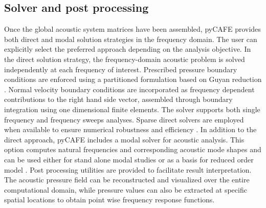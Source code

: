 \documentclass{jors}
\begin{document}
\subsection*{Solver and post processing}
Once the global acoustic system matrices have been assembled, pyCAFE provides both direct and modal solution strategies in the frequency domain. The user can explicitly select the preferred approach depending on the analysis objective. In the direct solution strategy, the frequency-domain acoustic problem is solved independently at each frequency of interest. Prescribed pressure boundary conditions are enforced using a partitioned formulation based on Guyan reduction \cite{Guyan1965, Kidder1973}. Normal velocity boundary conditions are incorporated as frequency dependent contributions to the right hand side vector, assembled through boundary integration using one dimensional finite elements. The solver supports both single frequency and frequency sweeps analyses. Sparse direct solvers are employed when available to ensure numerical robustness and efficiency \cite{Damhaug1993}. In addition to the direct approach, pyCAFE includes a modal solver for acoustic analysis. This option computes natural frequencies and corresponding acoustic mode shapes and can be used either for stand alone modal studies or as a basis for reduced order model \cite{Cai2024}. Post processing utilities are provided to facilitate result interpretation. The acoustic pressure field can be reconstructed and visualized over the entire computational domain, while pressure values can also be extracted at specific spatial locations to obtain point wise frequency response functions.
\end{document}
